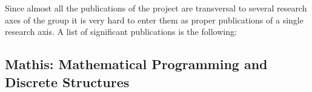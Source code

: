 
Since almost all the publications of the project are transversal to several research axes of the group it is very hard to enter them as proper publications of a single research axis. A list of significant publications is the following: \cite{Abu-Khzam2016Data-1204494, DBLP:conf/ijcai/AzizLM16, Bazgan2017Structural-1204463, DBLP:journals/algorithmica/BonnetE0P15, DBLP:journals/algorithmica/BonnetEPT15, DBLP:journals/algorithmica/BourgeoisEPR12, DBLP:conf/stacs/BonnetLP16, Crowston2014Satisfying-904498, DBLP:journals/algorithmica/EscoffierGM17, DBLP:conf/ijcai/FaliszewskiGLLM16,DBLP:conf/stacs/FotakisLP16, DBLP:conf/soda/Jeong0O16, DBLP:journals/algorithmica/GutinKSSY12, Gutin2012Parameterized-904512, Guillemot2013Finding-1017097, Karpinski2015New-1298222, DBLP:conf/icalp/0002LPRRSS13, Kim2015A-619500, Lampis2014Parameterized-1298206, DBLP:conf/atal/LangMSZ17}


\subsection{Mathis: Mathematical Programming and Discrete Structures}

